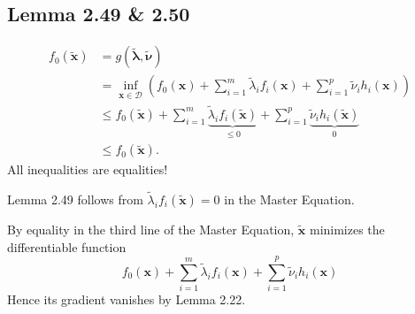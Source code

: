 \subsection*{Lemma 2.49 \& 2.50}
$$
\begin{aligned}
f_{0}(\tilde{\mathbf{x}}) &=g(\tilde{\boldsymbol{\lambda}}, \tilde{\boldsymbol{\nu}}) \\
&=\inf _{\mathbf{x} \in \mathcal{D}}\left(f_{0}(\mathbf{x})+\sum_{i=1}^{m} \tilde{\lambda}_{i} f_{i}(\mathbf{x})+\sum_{i=1}^{p} \tilde{\nu}_{i} h_{i}(\mathbf{x})\right) \\
& \leq f_{0}(\tilde{\mathbf{x}})+\sum_{i=1}^{m} \underbrace{\tilde{\lambda}_{i} f_{i}(\tilde{\mathbf{x}})}_{\leq 0}+\sum_{i=1}^{p} \underbrace{\tilde{\nu}_{i} h_{i}(\tilde{\mathbf{x}})}_{0} \\
& \leq f_{0}(\tilde{\mathbf{x}}) .
\end{aligned}
$$
All inequalities are equalities!

Lemma 2.49 follows from
$
\tilde{\lambda}_{i} f_{i}(\tilde{\mathbf{x}})=0
$
in the Master Equation.

By equality in the third line of the Master Equation, $\tilde{\mathbf{x}}$ minimizes the differentiable function
$$
f_{0}(\mathbf{x})+\sum_{i=1}^{m} \tilde{\lambda}_{i} f_{i}(\mathbf{x})+\sum_{i=1}^{p} \tilde{\nu}_{i} h_{i}(\mathbf{x})
$$
Hence its gradient vanishes by Lemma 2.22.